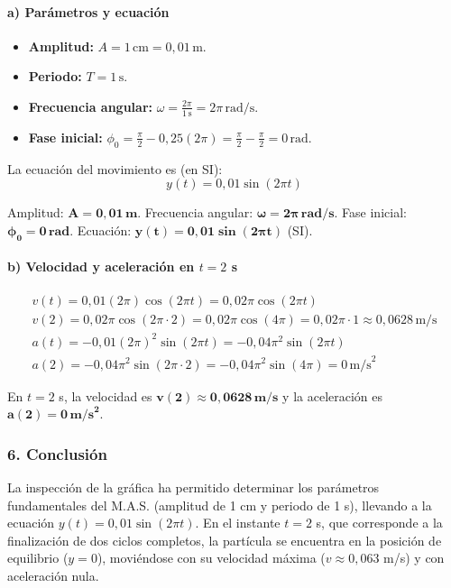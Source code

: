 \paragraph{a) Parámetros y ecuación}
\begin{itemize}
    \item \textbf{Amplitud:} $A = 1\,\text{cm} = 0,01\,\text{m}$.
    \item \textbf{Periodo:} $T = 1\,\text{s}$.
    \item \textbf{Frecuencia angular:} $\omega = \frac{2\pi}{1\,\text{s}} = 2\pi\,\text{rad/s}$.
    \item \textbf{Fase inicial:} $\phi_0 = \frac{\pi}{2} - 0,25(2\pi) = \frac{\pi}{2} - \frac{\pi}{2} = 0\,\text{rad}$.
\end{itemize}
La ecuación del movimiento es (en SI):
$$ y(t) = 0,01\sin(2\pi t) $$
\begin{cajaresultado}
Amplitud: $\boldsymbol{A=0,01\,\textbf{m}}$. Frecuencia angular: $\boldsymbol{\omega=2\pi\,\textbf{rad/s}}$. Fase inicial: $\boldsymbol{\phi_0=0\,\textbf{rad}}$.
Ecuación: $\boldsymbol{y(t) = 0,01\sin(2\pi t)}$ (SI).
\end{cajaresultado}

\paragraph{b) Velocidad y aceleración en $t=2$ s}
\begin{gather}
    v(t) = 0,01(2\pi)\cos(2\pi t) = 0,02\pi\cos(2\pi t) \\
    v(2) = 0,02\pi\cos(2\pi \cdot 2) = 0,02\pi\cos(4\pi) = 0,02\pi \cdot 1 \approx 0,0628 \, \text{m/s} \\
    a(t) = -0,01(2\pi)^2\sin(2\pi t) = -0,04\pi^2\sin(2\pi t) \\
    a(2) = -0,04\pi^2\sin(2\pi \cdot 2) = -0,04\pi^2\sin(4\pi) = 0 \, \text{m/s}^2
\end{gather}
\begin{cajaresultado}
En $t=2$ s, la velocidad es $\boldsymbol{v(2) \approx 0,0628 \, \textbf{m/s}}$ y la aceleración es $\boldsymbol{a(2) = 0 \, \textbf{m/s}^2}$.
\end{cajaresultado}

\subsubsection*{6. Conclusión}
\begin{cajaconclusion}
La inspección de la gráfica ha permitido determinar los parámetros fundamentales del M.A.S. (amplitud de 1 cm y periodo de 1 s), llevando a la ecuación $y(t) = 0,01\sin(2\pi t)$. En el instante $t=2$ s, que corresponde a la finalización de dos ciclos completos, la partícula se encuentra en la posición de equilibrio ($y=0$), moviéndose con su velocidad máxima ($v \approx 0,063$ m/s) y con aceleración nula.
\end{cajaconclusion}

